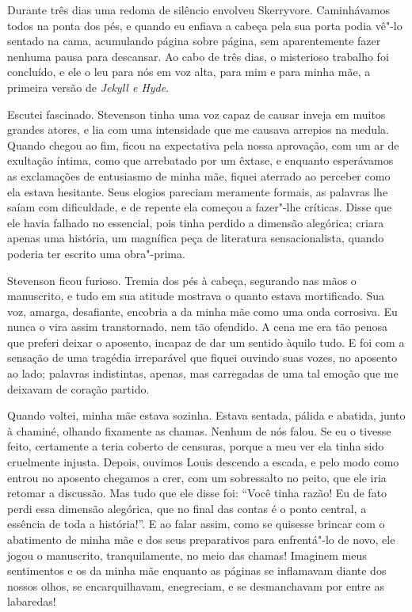 Durante três dias uma redoma de silêncio envolveu Skerryvore.
Caminhávamos todos na ponta dos pés, e quando eu enfiava a cabeça pela
sua porta podia vê"-lo sentado na cama, acumulando página sobre página,
sem aparentemente fazer nenhuma pausa para descansar.  Ao cabo de três
dias, o misterioso trabalho foi concluído, e ele o leu para nós em voz alta,
para mim e para minha mãe, a primeira versão de \textit{Jekyll e Hyde}.

Escutei fascinado.  Stevenson tinha uma voz capaz de causar inveja em
muitos grandes atores, e lia com uma intensidade que me causava
arrepios na medula.  Quando chegou ao fim, ficou na expectativa pela
nossa aprovação, com um ar de exultação íntima, como que arrebatado por
um êxtase, e enquanto esperávamos as exclamações de entusiasmo de minha
mãe, fiquei aterrado ao perceber como ela estava hesitante.  Seus
elogios pareciam meramente formais, as palavras lhe saíam com
dificuldade, e de repente ela começou a fazer"-lhe críticas.  Disse que
ele havia falhado no essencial, pois tinha perdido a dimensão
alegórica; criara apenas uma história, um magnífica peça de literatura
sensacionalista, quando poderia ter escrito uma obra"-prima.

Stevenson ficou furioso.  Tremia dos pés à cabeça, segurando nas mãos o
manuscrito, e tudo em sua atitude mostrava o quanto estava mortificado.
 Sua voz, amarga, desafiante, encobria a da minha mãe como uma onda
corrosiva.  Eu nunca o vira assim transtornado, nem tão ofendido.  A
cena me era tão penosa que preferi deixar o aposento, incapaz de dar
um sentido àquilo tudo.  E foi com a sensação de uma tragédia irreparável
que fiquei ouvindo suas vozes, no aposento ao lado; palavras
indistintas, apenas, mas carregadas de uma tal emoção que me deixavam
de coração partido.

Quando voltei, minha mãe estava sozinha.  Estava sentada, pálida e
abatida, junto à chaminé, olhando fixamente as chamas.  Nenhum de nós
falou.  Se eu o tivesse feito, certamente a teria coberto de censuras,
porque a meu ver ela tinha sido cruelmente injusta.  Depois, ouvimos
Louis descendo a escada, e pelo modo como entrou no aposento chegamos a
crer, com um sobressalto no peito, que ele iria retomar a discussão. 
Mas tudo que ele disse foi: “Você tinha razão!  Eu de fato perdi essa
dimensão alegórica, que no final das contas é o ponto central, a
essência de toda a história!”.  E ao falar assim, como se quisesse
brincar com o abatimento de minha mãe e dos seus preparativos para
enfrentá"-lo de novo, ele jogou o manuscrito, tranquilamente, no meio
das chamas!  Imaginem meus sentimentos e os da minha mãe enquanto as
páginas se inflamavam diante dos nossos olhos, se encarquilhavam,
enegreciam, e se desmanchavam por entre as labaredas!

